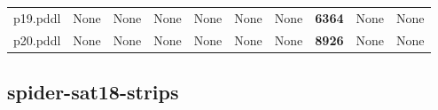 \documentclass{article}
\begin{document}
\begin{tabular}{@{}lrrrrrrrrr@{}}
p19.pddl & \multicolumn{1}{|l|}{None} & \multicolumn{1}{|l|}{None} & \multicolumn{1}{|l|}{None} & \multicolumn{1}{|l|}{None} & \multicolumn{1}{|l|}{None} & \multicolumn{1}{|l|}{None} & \textbf{6364} & \multicolumn{1}{|l|}{None} & \multicolumn{1}{|l|}{None} \\
p20.pddl & \multicolumn{1}{|l|}{None} & \multicolumn{1}{|l|}{None} & \multicolumn{1}{|l|}{None} & \multicolumn{1}{|l|}{None} & \multicolumn{1}{|l|}{None} & \multicolumn{1}{|l|}{None} & \textbf{8926} & \multicolumn{1}{|l|}{None} & \multicolumn{1}{|l|}{None} \\
\end{tabular}

\hypertarget{restrictions-spider-sat18-strips}{}
\subsection*{spider-sat18-strips}
\end{document}
